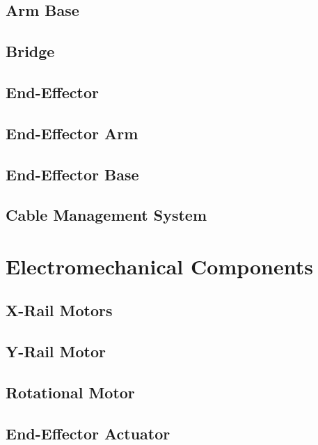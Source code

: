 \documentclass[titlepage]{article}
\begin{document}
\subsection{Arm Base}
\subsection{Bridge}
\subsection{End-Effector}
\subsection{End-Effector Arm}
\subsection{End-Effector Base}
\subsection{Cable Management System}



\section{Electromechanical Components}
\subsection{X-Rail Motors}
\subsection{Y-Rail Motor}
\subsection{Rotational Motor}
\subsection{End-Effector Actuator}
\end{document}
